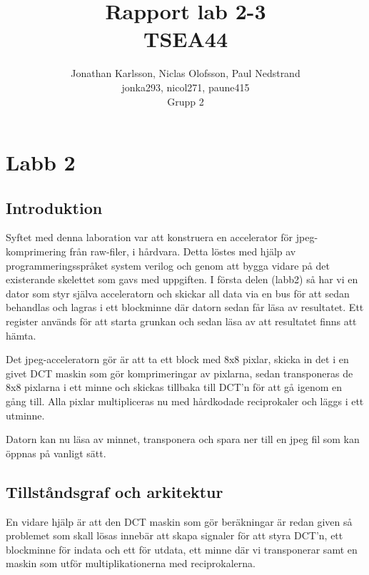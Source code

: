 \documentclass[a4paper]{article}
\author{Jonathan Karlsson, Niclas Olofsson, Paul Nedstrand\\jonka293, nicol271, paune415\\Grupp 2}
\title{Rapport lab 2-3\\ \vspace{2 mm} {\large TSEA44}}
\begin{document}
\maketitle

\newpage

\tableofcontents

\newpage
\section{Labb 2}
\subsection{Introduktion}

Syftet med denna laboration var att konstruera en accelerator för jpeg-
komprimering från raw-filer, i hårdvara. Detta löstes med hjälp av
programmeringsspråket system verilog och genom att bygga vidare på det
existerande skelettet som gavs med uppgiften. I första delen (labb2) så
har vi en dator som styr själva acceleratorn och skickar all data via en
bus för att sedan behandlas och lagras i ett blockminne där datorn sedan
får läsa av resultatet. Ett register används för att starta grunkan och
sedan läsa av att resultatet finns att hämta.

Det jpeg-acceleratorn gör är att ta ett block med 8x8 pixlar, skicka in
det i en givet DCT maskin som gör komprimeringar av pixlarna, sedan
transponeras de 8x8 pixlarna i ett minne och skickas tillbaka till
DCT\rq{}n för att gå igenom en gång till. Alla pixlar multipliceras nu
med hårdkodade reciprokaler och läggs i ett utminne.

Datorn kan nu läsa av minnet, transponera och spara ner till en jpeg fil
som kan öppnas på vanligt sätt.

\subsection{Tillståndsgraf och arkitektur}

En vidare hjälp är att den DCT maskin som gör beräkningar är redan given
så problemet som skall lösas innebär att skapa signaler för att styra
DCT\rq{}n, ett blockminne för indata och ett för utdata, ett minne där
vi transponerar samt en maskin som utför multiplikationerna med
reciprokalerna.
\end{document}
